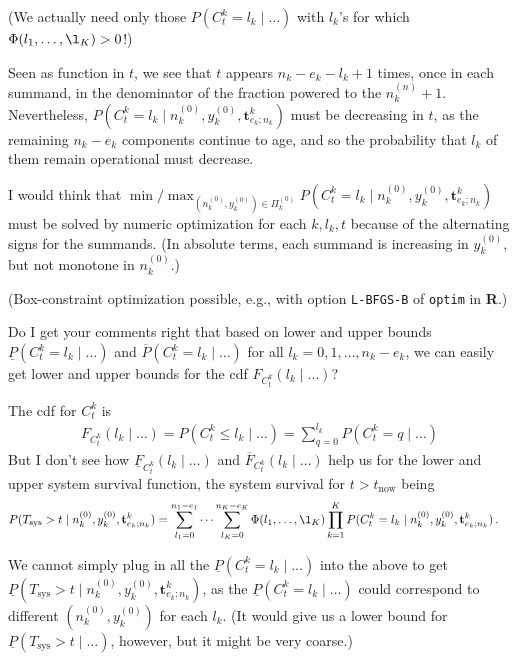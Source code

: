 \documentclass[12pt,a4paper,fleqn]{narms}
\newcommand{\mbf}[1]{\mathbf{#1}}
\newcommand{\uz}{^{(0)}} %
\newcommand{\un}{^{(n)}} %
\newcommand{\ul}[1]{\underline{#1}}
\newcommand{\ol}[1]{\overline{#1}}
\def\Tsys{T_\text{sys}}
\def\ykz{y\uz_k}
\def\nkz{n\uz_k}
\def\nkn{n\un_k}
\def\PkZ{\Pi\uz_k}
\def\tnow{t_\text{now}}
\begin{document}
(We actually need only those $P(C^k_t = l_k\mid \ldots)$ with $l_k$'s
for which $\Phi(l_1,\ldots,\l_K) > 0$!)


Seen as function in $t$, we see that $t$ appears $n_k-e_k-l_k+1$ times,
once in each summand, in the denominator of the fraction powered to the $\nkn+1$.
Nevertheless, $P(C^k_t = l_k\mid\nkz,\ykz, \mbf{t}^k_{e_k;n_k})$
must be decreasing in $t$, as the remaining $n_k-e_k$ components continue to age,
and so the probability that $l_k$ of them remain operational must decrease.

I would think that
$\min / \max_{(\nkz,\ykz) \in \PkZ} P(C^k_t = l_k\mid\nkz,\ykz, \mbf{t}^k_{e_k;n_k})$
must be solved by numeric optimization for each $k, l_k, t$ 
because of the alternating signs for the summands.
(In absolute terms, each summand is increasing in $\ykz$, but not monotone in $\nkz$.)

(Box-constraint optimization possible, e.g., with option \texttt{L-BFGS-B} of \texttt{optim} in \textbf{R}.)

Do I get your comments right that based on lower and upper bounds
$\ul{P}(C^k_t = l_k\mid \ldots)$ and $\ol{P}(C^k_t = l_k\mid \ldots)$ for all $l_k = 0, 1, \ldots, n_k - e_k$,
we can easily get lower and upper bounds for the cdf $F_{C^k_t}(l_k \mid \ldots)$?

The cdf for $C^k_t$ is 
\begin{align}
F_{C^k_t}(l_k \mid \ldots) = P(C^k_t \leq l_k\mid\ldots) = \sum_{q=0}^{l_k} P(C^k_t = q\mid\ldots)
\end{align} 
But I don't see how $\ul{F}_{C^k_t}(l_k \mid \ldots)$ and $\ol{F}_{C^k_t}(l_k \mid \ldots)$
help us for the lower and upper system survival function,
the system survival for $t > \tnow$ being
\begin{align}
P(\Tsys > t\mid\nkz,\ykz, \mbf{t}^k_{e_k;n_k})
 &= \sum_{l_1=0}^{n_1-e_1} \cdots \sum_{l_K=0}^{n_K-e_K} \Phi(l_1,\ldots,\l_K) \prod_{k=1}^K
    P(C^k_t = l_k\mid\nkz,\ykz, \mbf{t}^k_{e_k;n_k}) \,.
\end{align}

We cannot simply plug in all the $\ul{P}(C^k_t = l_k\mid \ldots)$ %
into the above to get $\ul{P}(\Tsys > t\mid\nkz,\ykz, \mbf{t}^k_{e_k;n_k})$, %
as the $\ul{P}(C^k_t = l_k\mid \ldots)$ could correspond to different $(\nkz,\ykz)$ for each $l_k$.
(It would give us a lower bound for $\ul{P}(\Tsys > t\mid\ldots)$, however, but it might be very coarse.)
\end{document}
